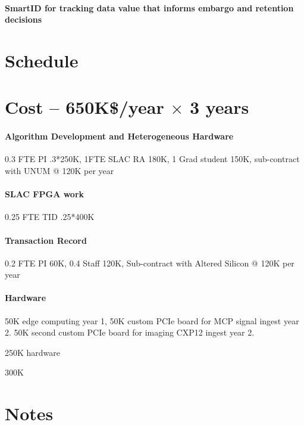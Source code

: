 \documentclass{article}
\begin{document}
\paragraph{SmartID for tracking data value that informs embargo and retention decisions}

\section{Schedule}

\section{Cost -- 650K\$/year $\times$ 3 years}
\paragraph{Algorithm Development and Heterogeneous Hardware} 0.3 FTE PI .3*250K, 1FTE SLAC RA 180K, 1 Grad student 150K, sub-contract with UNUM @ 120K per year
\paragraph{SLAC FPGA work} 0.25 FTE TID .25*400K
\paragraph{Transaction Record} 0.2 FTE PI 60K, 0.4 Staff 120K, Sub-contract with Altered Silicon @ 120K per year
\paragraph{Hardware} 50K edge computing year 1, 50K custom PCIe board for MCP signal ingest year 2.  50K second custom PCIe board for imaging CXP12 ingest year 2.


250K hardware

300K









\pagebreak
\section{Notes}
\end{document}
